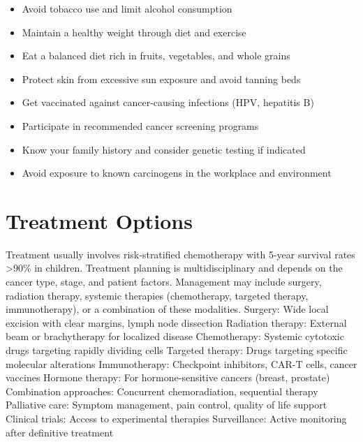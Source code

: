 \begin{itemize}[noitemsep]
  \item Avoid tobacco use and limit alcohol consumption
  \item Maintain a healthy weight through diet and exercise
  \item Eat a balanced diet rich in fruits, vegetables, and whole grains
  \item Protect skin from excessive sun exposure and avoid tanning beds
  \item Get vaccinated against cancer-causing infections (HPV, hepatitis B)
  \item Participate in recommended cancer screening programs
  \item Know your family history and consider genetic testing if indicated
  \item Avoid exposure to known carcinogens in the workplace and environment
\end{itemize}
\section{Treatment Options}
Treatment usually involves risk-stratified chemotherapy with 5-year survival rates >90\% in children. Treatment planning is multidisciplinary and depends on the cancer type, stage, and patient factors. Management may include surgery, radiation therapy, systemic therapies (chemotherapy, targeted therapy, immunotherapy), or a combination of these modalities. Surgery: Wide local excision with clear margins, lymph node dissection Radiation therapy: External beam or brachytherapy for localized disease Chemotherapy: Systemic cytotoxic drugs targeting rapidly dividing cells Targeted therapy: Drugs targeting specific molecular alterations Immunotherapy: Checkpoint inhibitors, CAR-T cells, cancer vaccines Hormone therapy: For hormone-sensitive cancers (breast, prostate) Combination approaches: Concurrent chemoradiation, sequential therapy Palliative care: Symptom management, pain control, quality of life support Clinical trials: Access to experimental therapies Surveillance: Active monitoring after definitive treatment

